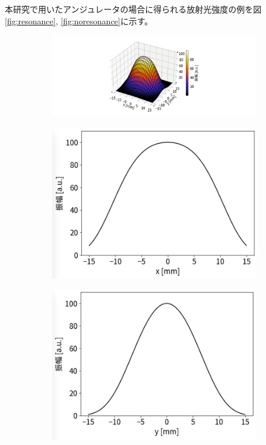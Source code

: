 \documentclass[a4paper,11pt,uplatex]{jsbook}
\begin{document}
本研究で用いたアンジュレータの場合に得られる放射光強度の例を図\ref{fig:resonance}, \ref{fig:noresonance}に示す。
\begin{figure}[H]
  \centering
  \begin{subfigure}[h]{\linewidth}
    \centering
    \includegraphics[width=0.9\linewidth]{image/2-spec_res.png}
  \end{subfigure}
  \hfill
  \vspace{1em}
  \begin{subfigure}[h]{0.35\linewidth}
    \centering
    \includegraphics[width=\linewidth]{image/2-spec_res_x.png}
  \end{subfigure}
  \hfill
  \begin{subfigure}[h]{0.35\linewidth}
    \centering
    \includegraphics[width=\linewidth]{image/2-spec_res_y.png}

\end{subfigure}
\end{figure}
\end{document}
